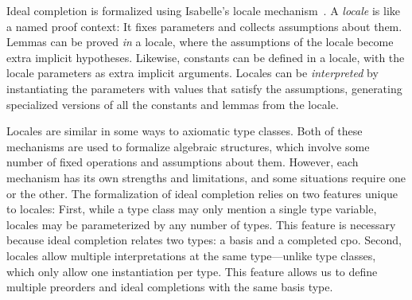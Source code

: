 Ideal completion is formalized using Isabelle's locale mechanism~\cite{KWP99locales, Ballarin10}. A \emph{locale} is like a named proof context: It fixes parameters and collects assumptions about them. Lemmas can be proved \emph{in} a locale, where the assumptions of the locale become extra implicit hypotheses. Likewise, constants can be defined in a locale, with the locale parameters as extra implicit arguments. Locales can be \emph{interpreted} by instantiating the parameters with values that satisfy the assumptions, generating specialized versions of all the constants and lemmas from the locale.

Locales are similar in some ways to axiomatic type classes. Both of these mechanisms are used to formalize algebraic structures, which involve some number of fixed operations and assumptions about them. However, each mechanism has its own strengths and limitations, and some situations require one or the other. The formalization of ideal completion relies on two features unique to locales: First, while a type class may only mention a single type variable, locales may be parameterized by any number of types. This feature is necessary because ideal completion relates two types: a basis and a completed cpo. Second, locales allow multiple interpretations at the same type---unlike type classes, which only allow one instantiation per type. This feature allows us to define multiple preorders and ideal completions with the same basis type.


